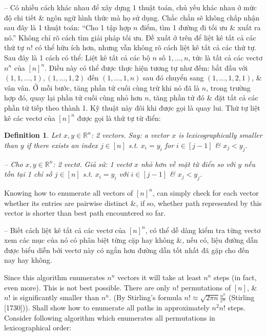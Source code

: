 \documentclass{article}
\newtheorem{definition}{Definition}
\begin{document}
\begin{itemize}
\begin{itemize}
        -- Có nhiều cách khác nhau để xây dựng 1 thuật toán, chủ yếu khác nhau ở mức độ chi tiết \& ngôn ngữ hình thức mà họ sử dụng. Chắc chắn sẽ không chấp nhận sau đây là 1 thuật toán: ``Cho 1 tập hợp $n$ điểm, tìm 1 đường đi tối ưu \& xuất ra nó.'' Không chỉ rõ cách tìm giải pháp tối ưu. Đề xuất ở trên để liệt kê tất cả các thứ tự $n!$ có thể hữu ích hơn, nhưng vẫn không rõ cách liệt kê tất cả các thứ tự. Sau đây là 1 cách có thể: Liệt kê tất cả các bộ $n$ số $1,\ldots,n$, tức là tất cả các vectơ $n^n$ của $[n]^n$. Điều này có thể được thực hiện tương tự như đếm: bắt đầu với $(1,1,\ldots,1),(1,\ldots,1,2)$ đến $(1,\ldots,1,n)$ sau đó chuyển sang $(1,\ldots,1,2,1)$, \& vân vân. Ở mỗi bước, tăng phần tử cuối cùng trừ khi nó đã là $n$, trong trường hợp đó, quay lại phần tử cuối cùng nhỏ hơn $n$, tăng phần tử đó \& đặt tất cả các phần tử tiếp theo thành 1. Kỹ thuật này đôi khi được gọi là quay lui. Thứ tự liệt kê các vectơ của $[n]^n$ được gọi là thứ tự từ điển:

        \begin{definition}
            Let $x,y\in\mathbb{R}^n$: 2 vectors. Say: a vector $x$ is {\rm lexicographically smaller} than $y$ if there exists an index $j\in[n]$ s.t. $x_i = y_i$ for $i\in[j - 1]$ \& $x_j < y_j$.

            -- Cho $x,y\in\mathbb{R}^n$: 2 vectơ. Giả sử: 1 vectơ $x$ {\rm nhỏ hơn về mặt từ điển} so với $y$ nếu tồn tại 1 chỉ số $j\in[n]$ s.t. $x_i = y_i$ với $i\in[j - 1]$ \& $x_j < y_j$.
        \end{definition}
        Knowing how to enumerate all vectors of $[n]^n$, can simply check for each vector whether its entries are pairwise distinct \&, if so, whether path represented by this vector is shorter than best path encountered so far.

        -- Biết cách liệt kê tất cả các vectơ của $[n]^n$, có thể dễ dàng kiểm tra từng vectơ xem các mục của nó có phân biệt từng cặp hay không \&, nếu có, liệu đường dẫn được biểu diễn bởi vectơ này có ngắn hơn đường dẫn tốt nhất đã gặp cho đến nay hay không.

        Since this algorithm enumerates $n^n$ vectors it will take at least $n^n$ steps (in fact, even more). This is not best possible. There are only $n!$ permutations of $[n]$, \& $n!$ is significantly smaller than $n^n$. (By Stirling's formula $n!\approx\sqrt{2\pi n}\frac{n^n}{e^n}$ (Stirling [1730])). Shall show how to enumerate all paths in approximately $n^2n!$ steps. Consider following algorithm which enumerates all permutations in lexicographical order:


\end{itemize}
\end{itemize}
\end{document}
